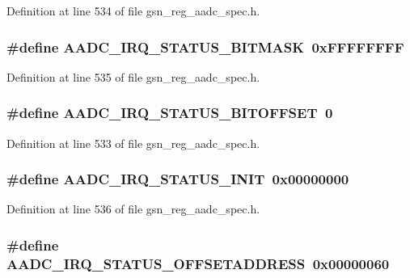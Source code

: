 Definition at line 534 of file gsn\_\-reg\_\-aadc\_\-spec.h.

\hypertarget{a00543_a721b8c90938becaca77c9814dbdca3aa}{
\subsubsection[{AADC\_\-IRQ\_\-STATUS\_\-BITMASK}]{\setlength{\rightskip}{0pt plus 5cm}\#define AADC\_\-IRQ\_\-STATUS\_\-BITMASK~0xFFFFFFFF}}
\label{a00543_a721b8c90938becaca77c9814dbdca3aa}


Definition at line 535 of file gsn\_\-reg\_\-aadc\_\-spec.h.

\hypertarget{a00543_a9f7eb15d367ca6cd341dda58fef4266d}{
\subsubsection[{AADC\_\-IRQ\_\-STATUS\_\-BITOFFSET}]{\setlength{\rightskip}{0pt plus 5cm}\#define AADC\_\-IRQ\_\-STATUS\_\-BITOFFSET~0}}
\label{a00543_a9f7eb15d367ca6cd341dda58fef4266d}


Definition at line 533 of file gsn\_\-reg\_\-aadc\_\-spec.h.

\hypertarget{a00543_a09e3e2376c6c0444fc6fe50c242a1cfb}{
\subsubsection[{AADC\_\-IRQ\_\-STATUS\_\-INIT}]{\setlength{\rightskip}{0pt plus 5cm}\#define AADC\_\-IRQ\_\-STATUS\_\-INIT~0x00000000}}
\label{a00543_a09e3e2376c6c0444fc6fe50c242a1cfb}


Definition at line 536 of file gsn\_\-reg\_\-aadc\_\-spec.h.

\hypertarget{a00543_a40d52f20165e64fa7ff8e0bdba13998d}{
\subsubsection[{AADC\_\-IRQ\_\-STATUS\_\-OFFSETADDRESS}]{\setlength{\rightskip}{0pt plus 5cm}\#define AADC\_\-IRQ\_\-STATUS\_\-OFFSETADDRESS~0x00000060}}
\label{a00543_a40d52f20165e64fa7ff8e0bdba13998d}


